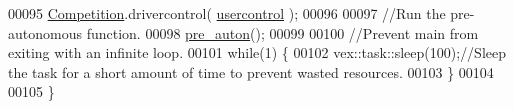 \begin{DoxyCode}
00095     \mbox{\hyperlink{main_8cpp_ae38c1d025caf302610a55e0a7a9db5dd_ae38c1d025caf302610a55e0a7a9db5dd}{Competition}}.drivercontrol( \mbox{\hyperlink{main_8cpp_a0b51ae97a13db57021eefe87a9903444_a0b51ae97a13db57021eefe87a9903444}{usercontrol}} );
00096     
00097     \textcolor{comment}{//Run the pre-autonomous function. }
00098     \mbox{\hyperlink{main_8cpp_ac6b858ea8606cdfaee934aac6be66a96_ac6b858ea8606cdfaee934aac6be66a96}{pre\_auton}}();
00099        
00100     \textcolor{comment}{//Prevent main from exiting with an infinite loop.                        }
00101     \textcolor{keywordflow}{while}(1) \{
00102       vex::task::sleep(100);\textcolor{comment}{//Sleep the task for a short amount of time to prevent wasted resources.}
00103     \}    
00104        
00105 \}
\end{DoxyCode}

